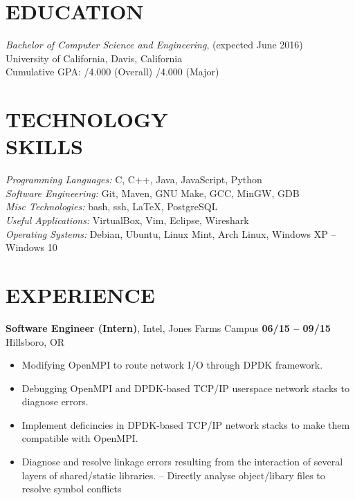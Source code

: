 \documentclass[line, letterpaper, 10pt]{res}
\begin{document}
\address{jmmcgee@ucdavis.edu | (323) 557-8647}

\begin{resume}


\section{EDUCATION}
    {\sl Bachelor of Computer Science and Engineering}, (expected June 2016) \\
    University of California, Davis, California \\
    Cumulative GPA: /4.000 (Overall) /4.000 (Major)

\section{TECHNOLOGY \\ SKILLS}
    {\sl Programming Languages:}  C, C++, Java, JavaScript, Python \\
    {\sl Software Engineering:} Git, Maven, GNU Make, GCC, MinGW, GDB \\
    {\sl Misc Technologies:} bash, ssh, LaTeX, PostgreSQL \\
    {\sl Useful Applications:} VirtualBox, Vim, Eclipse, Wireshark \\
    {\sl Operating Systems:} Debian, Ubuntu, Linux Mint, Arch Linux, Windows XP -- Windows 10

\section{EXPERIENCE}

    {\bf Software Engineer (Intern)}, Intel, Jones Farms Campus \hfill {\bf 06/15 -- 09/15} \\
    Hillsboro, OR
    \begin{itemize} \itemsep -2pt
        \item Modifying OpenMPI to route network I/O through DPDK framework.
        \item Debugging OpenMPI and DPDK-based TCP/IP userspace network stacks to diagnose errors.
        \item Implement deficincies in DPDK-based TCP/IP network stacks to make them compatible with OpenMPI.
        \item Diagnose and resolve linkage errors resulting from the interaction of several layers of shared/static libraries.
            \subitem -- Directly analyse object/libary files to resolve symbol conflicts
    \end{itemize}


\end{resume}
\end{document}
